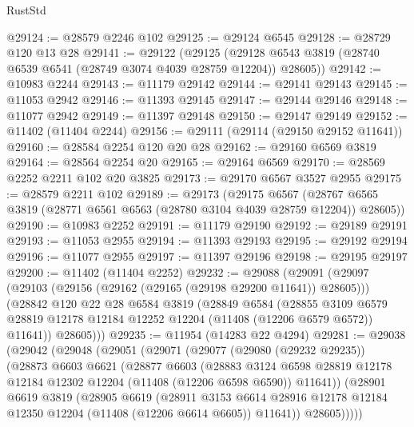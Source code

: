 \begin{lexlean}{RustStd}
\begin{coremodule}
@29124 := @28579 @2246 @102
@29125 := @29124 @6545
@29128 := @28729 @120 @13 @28
@29141 := @29122
    (@29125 (@29128 @6543 @3819 (@28740 @6539 @6541 (@28749 @3074 @4039 @28759 @12204)) @28605))
@29142 := @10983 @2244
@29143 := @11179 @29142
@29144 := @29141 @29143
@29145 := @11053 @2942
@29146 := @11393 @29145
@29147 := @29144 @29146
@29148 := @11077 @2942
@29149 := @11397 @29148
@29150 := @29147 @29149
@29152 := @11402 (@11404 @2244)
@29156 := @29111 (@29114 (@29150 @29152 @11641))
@29160 := @28584 @2254 @120 @20 @28
@29162 := @29160 @6569 @3819
@29164 := @28564 @2254 @20
@29165 := @29164 @6569
@29170 := @28569 @2252 @2211 @102 @20 @3825
@29173 := @29170 @6567 @3527 @2955
@29175 := @28579 @2211 @102
@29189 := @29173
    (@29175
      @6567
      (@28767 @6565 @3819 (@28771 @6561 @6563 (@28780 @3104 @4039 @28759 @12204)) @28605))
@29190 := @10983 @2252
@29191 := @11179 @29190
@29192 := @29189 @29191
@29193 := @11053 @2955
@29194 := @11393 @29193
@29195 := @29192 @29194
@29196 := @11077 @2955
@29197 := @11397 @29196
@29198 := @29195 @29197
@29200 := @11402 (@11404 @2252)
@29232 := @29088
    (@29091
      (@29097
        (@29103 (@29156 (@29162 (@29165 (@29198 @29200 @11641)) @28605)))
        (@28842
          @120
          @22
          @28
          @6584
          @3819
          (@28849
            @6584
            (@28855
              @3109
              @6579
              @28819
              @12178
              @12184
              @12252
              @12204
              (@11408 (@12206 @6579 @6572))
              @11641))
          @28605)))
@29235 := @11954 (@14283 @22 @4294)
@29281 := @29038
    (@29042
      (@29048
        (@29051
          (@29071
            (@29077
              (@29080 (@29232 @29235))
              (@28873
                @6603
                @6621
                (@28877
                  @6603
                  (@28883
                    @3124
                    @6598
                    @28819
                    @12178
                    @12184
                    @12302
                    @12204
                    (@11408 (@12206 @6598 @6590))
                    @11641))
                (@28901
                  @6619
                  @3819
                  (@28905
                    @6619
                    (@28911
                      @3153
                      @6614
                      @28916
                      @12178
                      @12184
                      @12350
                      @12204
                      (@11408 (@12206 @6614 @6605))
                      @11641))
                  @28605)))))

\end{coremodule}
\end{lexlean}
